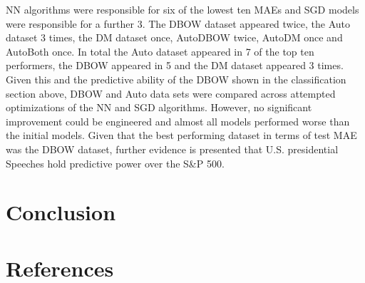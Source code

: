 \documentclass[11pt,preprint, authoryear]{elsarticle}
\numberwithin{equation}{section}
\numberwithin{figure}{section}
\numberwithin{table}{section}
\begin{document}
NN algorithms were responsible for six of the lowest ten MAEs and SGD
models were responsible for a further 3. The DBOW dataset appeared
twice, the Auto dataset 3 times, the DM dataset once, AutoDBOW twice,
AutoDM once and AutoBoth once. In total the Auto dataset appeared in 7
of the top ten performers, the DBOW appeared in 5 and the DM dataset
appeared 3 times. Given this and the predictive ability of the DBOW
shown in the classification section above, DBOW and Auto data sets were
compared across attempted optimizations of the NN and SGD algorithms.
However, no significant improvement could be engineered and almost all
models performed worse than the initial models. Given that the best
performing dataset in terms of test MAE was the DBOW dataset, further
evidence is presented that U.S. presidential Speeches hold predictive
power over the S\&P 500.

\hypertarget{conclusion}{%
\section{Conclusion}\label{conclusion}}

\newpage

\hypertarget{references}{%
\section*{References}\label{references}}
\end{document}
